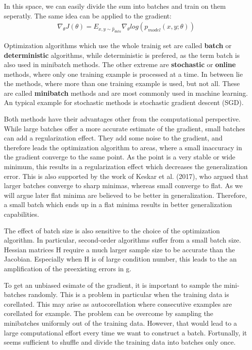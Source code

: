 In this space, we can easily divide the sum into batches and train on them
seperatly. The same idea can be applied to the gradient:
\begin{align}
    \nabla_\theta J(\theta)=E_{x,y\sim \hat{p}_{data}} \nabla_\theta log(p_{model}(x,y;\theta))
\end{align}

Optimization algorithms which use the whole trainig set are called
\textbf{batch} or \textbf{deterministic} algorithms, while deterministic is
prefered, as the term batch is also used in minibatch methods. The other extreme
are \textbf{stochastic} or \textbf{online} methods, where only one training
example is processed at a time. In between lie the methods, where more than one
training example is used, but not all. These are called \textbf{minibatch}
methods and are most commonly used in machine learning. An typical example for
stochastic methods is stochastic gradient descent (SGD).


Both methods have their advantages other from the computational perspective.
While large batches offer a more accurate estimate of the gradient, small
batches can add a regularization effect. They add some noise to the gradient,
and therefore leads the optimization algorithm to areas, where a small
inaccuracy in the gradient converge to the same point. As the point is a very
stable or wide minimum, this results in a regularization effect which decreases
the generalization error. This is also supported by the work of Keskar et al.
(2017), who argued that larger batches converge to sharp minimas, whereas small
converge to flat. As we will argue later flat minima are believed to be better
in generalization. Therefore, a small batch which ends up in a flat minima
results in better generalization capabilities.


The effect of batch size is also sensitive to the choice of the optimization
algorithm. In particular, second-order algorithms suffer from a small batch
size. Hessian matrices H require a much larger sample size to be accurate than
the Jacobian. Especially when H is of large condition number, this leads to the
an amplification of the preexisting errors in g.

To get an unbiased esimate of the gradient, it is important to sample the
mini-batches randomly. This is a problem in particular when the training data is
corellated. This may arise as autocorellation where consecutive examples are
corellated for example. The problem can be overcome by sampling the minibatches
uniformly out of the training data. However, that would lead to a large
computational effort every time we want to construct a batch. Fortunally, it
seems sufficient to shuffle and divide the training data into batches only once.

